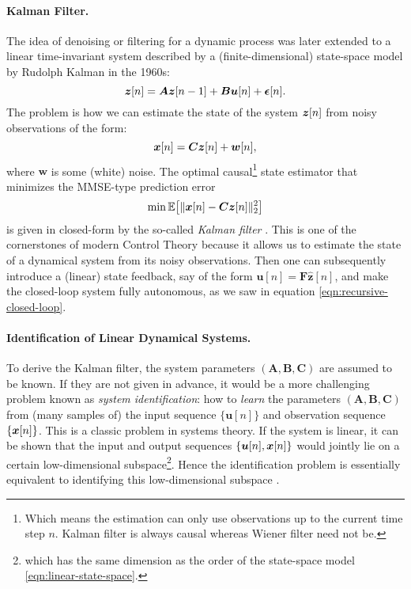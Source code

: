 \documentclass[../../book-main.tex]{subfiles}
\begin{document}
\paragraph{Kalman Filter.} 
The idea of denoising or filtering for a dynamic process was later extended to a linear time-invariant system described by a (finite-dimensional) state-space model by Rudolph Kalman in the 1960s:
\begin{equation}
    \bm{z}[n] = \boldsymbol{A} \bm{z}[n-1] + \boldsymbol{B}\boldsymbol{u}[n] + \boldsymbol{\epsilon}[n]. 
    \label{eqn:linear-state-space}
\end{equation}
The problem is how we can estimate the state of the system $\bm{z}[n]$ from noisy observations of the form: \begin{equation}\bm{x}[n] = \boldsymbol{C} \bm{z}[n] + \boldsymbol{w}[n],
\label{eqn:Kalman-model}
\end{equation}
where $\boldsymbol{w}$ is some (white) noise. The optimal causal\footnote{Which means the estimation can only use observations up to the current time step $n$. Kalman filter is always causal whereas Wiener filter need not be.} state estimator that minimizes the MMSE-type prediction error
\begin{equation}
    \min \mathbb{E}\big[ \|\bm{x}[n] - \boldsymbol{C}\bm{z}[n]\|_2^2\big]
\end{equation}
is given in closed-form by the so-called {\em Kalman filter} \cite{kalman1960new}. This is one of the cornerstones of modern Control Theory because it allows us to estimate the state of a dynamical system from its noisy observations. Then one can subsequently introduce a (linear) state feedback, say of the form $\boldsymbol{u}[n] = \boldsymbol{F} \hat{\boldsymbol{z}}[n]$, and make the closed-loop system fully autonomous, as we saw in equation \eqref{eqn:recursive-closed-loop}. 

\paragraph{Identification of Linear Dynamical Systems.}
To derive the Kalman filter, the system parameters $(\boldsymbol{A}, \boldsymbol{B}, \boldsymbol{C})$ are assumed to be known. If they are not given in advance, it would be a more challenging problem known as {\em system identification}: how to {\em learn} the parameters $(\boldsymbol{A}, \boldsymbol{B}, \boldsymbol{C})$ from (many samples of) the input sequence $\{\boldsymbol{u}[n]\}$ and observation sequence $\{\bm{x}[n]\}$. This is a classic problem in systems theory. If the system is linear, it can be shown that the input and output sequences $\{\boldsymbol{u}[n], \bm{x}[n]\}$ would jointly lie on a certain low-dimensional subspace\footnote{which has the same dimension as the order of the state-space model \eqref{eqn:linear-state-space}. }. Hence the identification problem is essentially equivalent to identifying this low-dimensional subspace \cite{OverscheeP1996,Liu-2009-CDC,Liu-2010-SIAM}. 
\end{document}
